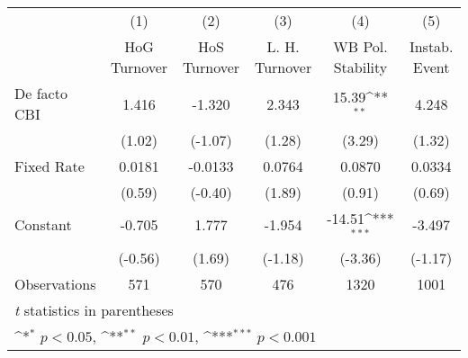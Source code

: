 \begin{table}[htbp]\centering
\def\sym#1{\ifmmode^{#1}\else\(^{#1}\)\fi}
\caption{\label{hiKfivs2}}
\begin{tabular}{l*{5}{c}}
\toprule
                                        &\multicolumn{1}{c}{(1)}&\multicolumn{1}{c}{(2)}&\multicolumn{1}{c}{(3)}&\multicolumn{1}{c}{(4)}&\multicolumn{1}{c}{(5)}\\
                                        &\multicolumn{1}{c}{HoG Turnover}&\multicolumn{1}{c}{HoS Turnover}&\multicolumn{1}{c}{L. H. Turnover}&\multicolumn{1}{c}{WB Pol. Stability}&\multicolumn{1}{c}{Instab. Event}\\
\midrule
De facto CBI                            &    1.416         &   -1.320         &    2.343         &    15.39\sym{**} &    4.248         \\
                                        &   (1.02)         &  (-1.07)         &   (1.28)         &   (3.29)         &   (1.32)         \\
\addlinespace
Fixed Rate                              &   0.0181         &  -0.0133         &   0.0764         &   0.0870         &   0.0334         \\
                                        &   (0.59)         &  (-0.40)         &   (1.89)         &   (0.91)         &   (0.69)         \\
\addlinespace
Constant                                &   -0.705         &    1.777         &   -1.954         &   -14.51\sym{***}&   -3.497         \\
                                        &  (-0.56)         &   (1.69)         &  (-1.18)         &  (-3.36)         &  (-1.17)         \\
\midrule
Observations                            &      571         &      570         &      476         &     1320         &     1001         \\
\bottomrule
\multicolumn{6}{l}{\footnotesize \textit{t} statistics in parentheses}\\
\multicolumn{6}{l}{\footnotesize \sym{*} \(p<0.05\), \sym{**} \(p<0.01\), \sym{***} \(p<0.001\)}\\
\end{tabular}
\end{table}
